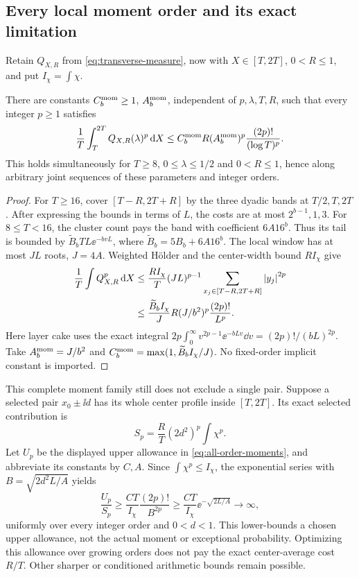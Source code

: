 \subsection{Every local moment order and its exact limitation}
Retain \(Q_{X,R}\) from \eqref{eq:transverse-measure}, now with
\(X\in[T,2T]\), \(0<R\le1\), and put \(I_\chi=\int\chi\).
\begin{corollary}\label{cor:all-order-moments}
There are constants \(C_b^{\rm mom}\ge1\), \(A_b^{\rm mom}\),
independent of \(p,\lambda,T,R\), such that every integer \(p\ge1\)
satisfies
\begin{equation}\label{eq:all-order-moments}
 \frac1T\int_T^{2T}Q_{X,R}(\lambda)^p\,\mathrm d X
 \le C_b^{\rm mom}R(A_b^{\rm mom})^p
                         \frac{(2p)!}{(\log T)^p}.
\end{equation}
This holds simultaneously for \(T\ge8\), \(0\le\lambda\le1/2\)
and \(0<R\le1\), hence along arbitrary joint sequences of these
parameters and integer orders.
\end{corollary}
\begin{proof}
For \(T\ge16\), cover \([T-R,2T+R]\) by the three dyadic bands at
\(T/2,T,2T\). After expressing the bounds in terms of \(L\), the costs
are at most \(2^{b-1},1,3\). For \(8\le T<16\), the cluster count
pays the band with coefficient \(6A16^b\). Thus its tail is bounded
by \(\widetilde B_bTL\ee^{-bvL}\), where
\(\widetilde B_b=5B_b+6A16^b\). The local window has at most
\(JL\) roots, \(J=4A\). Weighted H\"older and the center-width
bound \(RI_\chi\) give
\begin{align*}
 \frac1T\int Q_{X,R}^p\,\mathrm d X
 &\le\frac{RI_\chi}{T}(JL)^{p-1}
                   \sum_{x_j\in[T-R,2T+R]}\left|y_j\right|^{2p}\\
 &\le\frac{\widetilde B_b I_\chi}{J}R
             (J/b^2)^p\frac{(2p)!}{L^p}.
\end{align*}
Here layer cake uses the exact integral
\(2p\int_0^\infty v^{2p-1}\ee^{-bLv}\dd v=(2p)!/(bL)^{2p}\).
Take \(A_b^{\rm mom}=J/b^2\) and
\(C_b^{\rm mom}=\max(1,\widetilde B_bI_\chi/J)\).
No fixed-order implicit constant is imported.
\end{proof}

This complete moment family still does not exclude a single pair.
Suppose a selected pair \(x_0\pm\ii d\) has its whole center profile
inside \([T,2T]\). Its exact selected contribution is
\[
 S_p=\frac RT(2d^2)^p\int\chi^p.
\]
Let \(U_p\) be the displayed upper allowance in
\eqref{eq:all-order-moments}, and abbreviate its constants by \(C,A\).
Since \(\int\chi^p\le I_\chi\), the exponential series with
\(B=\sqrt{2d^2L/A}\) yields
\begin{equation}\label{eq:allowance-obstruction}
 \frac{U_p}{S_p}\ge\frac{CT}{I_\chi}\frac{(2p)!}{B^{2p}}
 \ge\frac{CT}{I_\chi}\ee^{-\sqrt{2L/A}}\longrightarrow\infty,
\end{equation}
uniformly over every integer order and \(0<d<1\). This lower-bounds
a chosen upper allowance, not the actual moment or exceptional
probability. Optimizing this allowance over growing orders does not pay
the exact center-average cost \(R/T\). Other sharper or conditioned
arithmetic bounds remain possible.

